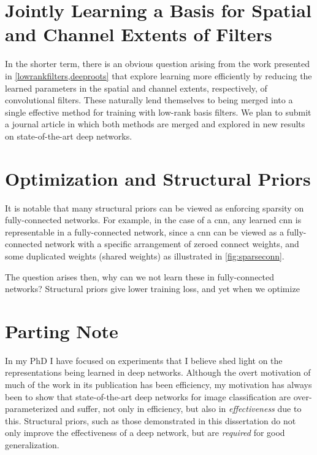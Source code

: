 \documentclass[thesis]{subfiles}
\begin{document}
\section{Jointly Learning a Basis for Spatial and Channel Extents of Filters}
\label{journalplan}
In the shorter term, there is an obvious question arising from the work presented in \cref{lowrankfilters,deeproots} that explore learning more efficiently by reducing the learned parameters in the spatial and channel extents, respectively, of convolutional filters. These naturally lend themselves to being merged into a single effective method for training with low-rank basis filters. We plan to submit a journal article in which both methods are merged and explored in new results on state-of-the-art deep networks.

\section{Optimization and Structural Priors}
It is notable that many structural priors can be viewed as enforcing sparsity on fully-connected networks. For example, in the case of a \gls{cnn}, any learned \gls{cnn} is representable in a fully-connected network, since a \gls{cnn} can be viewed as a fully-connected network with a specific arrangement of zeroed connect weights, and some duplicated weights (shared weights) as illustrated in \cref{fig:sparseconn}.

The question arises then, why can we not learn these in fully-connected networks? Structural priors give lower training loss, and yet when we optimize 
\section{Parting Note}
In my PhD I have focused on experiments that I believe shed light on the representations being learned in deep networks. Although the overt motivation of much of the work in its publication has been efficiency, my motivation has always been to show that state-of-the-art deep networks for image classification are over-parameterized and suffer, not only in efficiency, but also in \emph{effectiveness} due to this. Structural priors, such as those demonstrated in this dissertation do not only improve the effectiveness of a deep network, but are \emph{required} for good generalization.
\end{document}
